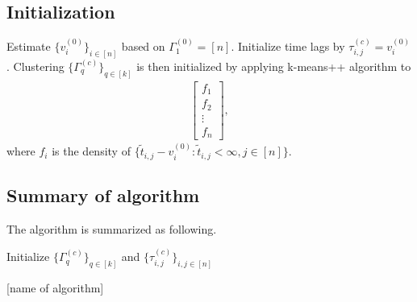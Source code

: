








\subsection{Initialization}

Estimate $\{v_i^{(0)}\}_{i\in[n]}$ based on $\Gamma_1^{(0)}=[n]$.
Initialize time lags by $\tau_{i,j}^{(c)}=v_i^{(0)}$.
Clustering 
$\{  \Gamma_q^{(c)} \}_{q\in[k]}$ is then initialized by applying k-means++ algorithm to 
\begin{align*}
\begin{bmatrix}
f_{1}\\
f_2\\
\vdots\\
f_n
\end{bmatrix},
\end{align*}
where $f_i$ is the density of $\{\tilde t_{i,j} - v_i^{(0)}: \tilde t_{i,j}<\infty, j\in[n]\}$.




\subsection{Summary of algorithm}

The algorithm is summarized as following. 

\begin{algorithm}[H]
\SetAlgoLined
 Initialize $\{  \Gamma_q^{(c)} \}_{q\in[k]}$ and $\{  \tau_{i,j}^{(c)} \}_{i,j\in [n]}$\;

 \caption{ [name of algorithm]}
\end{algorithm}





